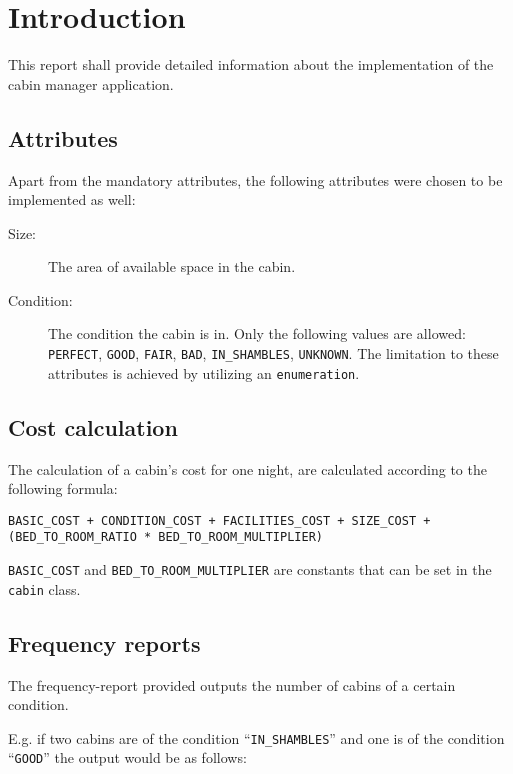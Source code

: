 \chapter{Introduction}\label{ch:introduction}

This report shall provide detailed information about the implementation of the cabin manager application.

\section{Attributes}
\label{sec:attributes}

Apart from the mandatory attributes, the following attributes were chosen to be implemented as well:
\begin{description}
\item[Size:] The area of available space in the cabin.
\item[Condition:] The condition the cabin is in. Only the following values are allowed: \texttt{PERFECT}, \texttt{GOOD}, \texttt{FAIR}, \texttt{BAD}, \texttt{IN\_SHAMBLES}, \texttt{UNKNOWN}. The limitation to these attributes is achieved by utilizing an \texttt{enumeration}.
\end{description}

\section{Cost calculation}
\label{sec:cost_calculation}

The calculation of a cabin's cost for one night, are calculated according to the following formula:

\texttt{BASIC\_COST + CONDITION\_COST + FACILITIES\_COST + SIZE\_COST + (BED\_TO\_ROOM\_RATIO * BED\_TO\_ROOM\_MULTIPLIER)}

\texttt{BASIC\_COST} and \texttt{BED\_TO\_ROOM\_MULTIPLIER} are constants that can be set in the \texttt{cabin} class.

\section{Frequency reports}
\label{sec:frequency_report}

The frequency-report provided outputs the number of cabins of a certain condition.

E.g. if two cabins are of the condition ``\texttt{IN\_SHAMBLES}'' and one is of the condition ``\texttt{GOOD}'' the output would be as follows:

